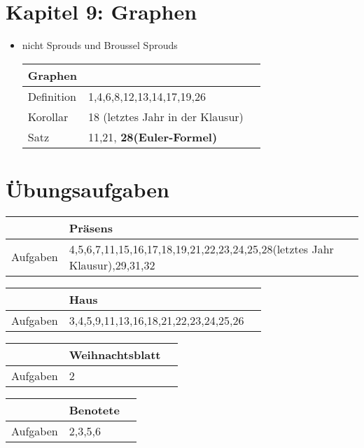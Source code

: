 \documentclass[11pt,a4paper]{article}
\begin{document}
\section*{Kapitel 9: Graphen}
\begin{itemize}
	\item nicht Sprouds und Broussel Sprouds
	\begin{center}
		\begin{tabular}{ | l | l | l | }
			\hline
			\textbf{Graphen}& \\ \hline	\hline	
			Definition&1,4,6,8,12,13,14,17,19,26\\ \hline
			Korollar&18 (letztes Jahr in der Klausur) \\ \hline
			Satz& 11,21, \textbf{28(Euler-Formel)}\\ 
			\hline	
		\end{tabular}
	\end{center}	
\end{itemize}

\section*{Übungsaufgaben}

	\begin{center}
		\begin{tabular}{ | l | l | l | }
			\hline
			&\textbf{Präsens} \\ \hline	\hline	
			Aufgaben&4,5,6,7,11,15,16,17,18,19,21,22,23,24,25,28(letztes Jahr Klausur),29,31,32\\
			\hline	
		\end{tabular}
	\end{center}
	\begin{center}
		\begin{tabular}{ | l | l | l | }
			\hline
			&\textbf{Haus}\\ \hline	\hline	
			Aufgaben&3,4,5,9,11,13,16,18,21,22,23,24,25,26\\
			\hline	
		\end{tabular}
	\end{center}	
	\begin{center}
		\begin{tabular}{ | l | l | l | }
			\hline
			&\textbf{Weihnachtsblatt} \\ \hline	\hline	
			Aufgaben&2\\
			\hline	
		\end{tabular}
	\end{center}
	\begin{center}
		\begin{tabular}{ | l | l | l | }
			\hline
			&\textbf{Benotete} \\ \hline	\hline	
			Aufgaben&2,3,5,6\\
			\hline	
		\end{tabular}
	\end{center}
\end{document}
